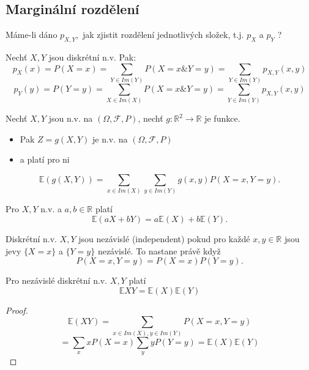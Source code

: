 \documentclass[../main.tex]{subfiles}
\begin{document}
\subsection{Marginální rozdělení}

Máme-li dáno $p_{X,Y},$ jak zjistit rozdělení jednotlivých složek, t.j. $p_X$ a $p_Y$ ?

\begin{theorem}
    Nechť $X,Y$ jsou diskrétní n.v. Pak:
    \[p_X(x) = P(X=x) = \sum_{Y\in Im(Y)} P(X = x \& Y=y) = \sum_{Y\in Im(Y)} p_{X,Y}(x,y)\]
    \[p_Y(y) = P(Y=y) = \sum_{X\in Im(X)} P(X = x \& Y=y) = \sum_{Y\in Im(Y)} p_{X,Y}(x,y)\]
\end{theorem}
\begin{theorem}
    Nechť $X,Y$ jsou n.v. na $(\Omega, \mathcal{F},P)$, nechť $g: \mathbb{R}^2 \rightarrow \mathbb{R}$ je funkce.
    \begin{itemize}
        \item Pak $Z = g(X,Y)$ je n.v. na $(\Omega, \mathcal{F},P)$
        \item a platí pro ni 
    \end{itemize}
    \[\mathbb{E}(g(X,Y)) = \sum_{x\in Im(X)} \sum_{y\in Im(Y)} g(x,y)P(X=x,Y=y).\]
\end{theorem}
\begin{theorem}
    Pro $X,Y$ n.v. a $a,b \in \mathbb{R}$ platí
    \[\mathbb{E}(aX + bY) = a\mathbb{E}(X) + b\mathbb{E}(Y).\]
\end{theorem}
\begin{definition}
    Diskrétní n.v. $X,Y$ jsou nezávislé (independent) pokud pro každé $x,y \in \mathbb{R}$ jsou jevy 
    $\{X=x\}$ a $\{Y=y\}$ nezávislé. To nastane právě když
    \[P(X=x,Y=y) = P(X=x)P(Y=y).\]
\end{definition}

\begin{theorem}
    Pro nezávislé diskrétní n.v. $X,Y$ platí
    \[\mathbb{E}XY = \mathbb{E}(X)\mathbb{E}(Y)\]
\end{theorem}
\begin{proof}
    \[\mathbb{E}(XY) = \sum_{x\in Im(X), y \in Im(Y)} P(X=x, Y=y)\]
    \[= \sum_x x P(X=x) \sum_y yP(Y=y) = \mathbb{E}(X)\mathbb{E}(Y)\]
\end{proof}
\end{document}
